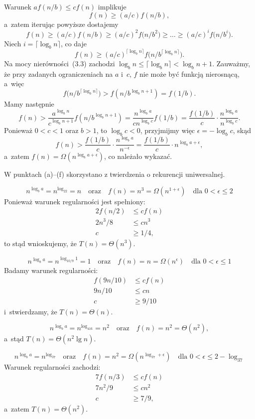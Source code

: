 \exercise %
Warunek $af(n/b)\le cf(n)$ implikuje
\[
	f(n) \ge (a/c)f(n/b),
\]
a~zatem iterując powyższe dostajemy
\[
	f(n) \ge (a/c)f(n/b) \ge (a/c)^2f\bigl(n/b^2\bigr) \ge \dots \ge (a/c)^if\bigl(n/b^i\bigr).
\]
Niech $i=\lceil\log_bn\rceil$, co daje
\[
	f(n) \ge (a/c)^{\lceil\log_bn\rceil}f\bigl(n/b^{\lceil\log_bn\rceil}\bigr).
\]
Na mocy nierówności~(3.3) zachodzi $\log_bn\le\lceil\log_b n\rceil<\log_bn+1$. Zauważmy, że przy zadanych ograniczeniach na $a$ i~$c$, $f$ nie może być funkcją nierosnącą, a~więc
\[
    f\bigl(n/b^{\lceil\log_bn\rceil}\bigr) > f(n/b^{\log_bn+1}) = f(1/b).
\]
Mamy następnie
\[
	f(n) > \frac{a^{\log_bn}}{c^{\log_bn+1}}f(n/b^{\log_bn+1}) = \frac{n^{\log_ba}}{cn^{\log_bc}}f(1/b) = \frac{f(1/b)}{c}\cdot\frac{n^{\log_ba}}{n^{\log_bc}}.
\]
Ponieważ $0<c<1$ oraz $b>1$, to $\log_bc<0$, przyjmijmy więc $\epsilon=-\log_bc$, skąd
\[
	f(n) > \frac{f(1/b)}{c}\cdot\frac{n^{\log_ba}}{n^{-\epsilon}} = \frac{f(1/b)}{c}\cdot n^{\log_ba+\epsilon},
\]
a~zatem $f(n)=\Omega(n^{\log_ba+\epsilon})$, co należało wykazać.

\problems

W punktach (a)\nobreakdash--(f) skorzystano z twierdzenia o rekurencji uniwersalnej.

\subproblem %
\[
	n^{\log_ba} = n^{\log_22} = n \quad\text{oraz}\quad f(n) = n^3 = \Omega(n^{1+\epsilon}) \quad\text{dla $0<\epsilon\le2$}
\]
Ponieważ warunek regularności jest spełniony:
\begin{align*}
	2f(n/2) &\le cf(n) \\
	2n^3\!/8 &\le cn^3 \\
	c &\ge 1/4,
\end{align*}
to stąd wnioskujemy, że $T(n)=\Theta(n^3)$.

\subproblem %
\[
	n^{\log_ba} = n^{\log_{10/9}1} = 1 \quad\text{oraz}\quad f(n) = n = \Omega(n^\epsilon) \quad\text{dla $0<\epsilon\le1$}
\]
Badamy warunek regularności:
\begin{align*}
	f(9n/10) &\le cf(n) \\
	9n/10 &\le cn \\
	c &\ge 9/10
\end{align*}
i~stwierdzamy, że $T(n)=\Theta(n)$.

\subproblem %
\[
	n^{\log_ba} = n^{\log_416} = n^2 \quad\text{oraz}\quad f(n) = n^2 = \Theta(n^2),
\]
a~stąd $T(n)=\Theta(n^2\lg n)$.

\subproblem %
\[
	n^{\log_ba} = n^{\log_37} \quad\text{oraz}\quad f(n) = n^2 = \Omega(n^{\log_37+\epsilon}) \quad\text{dla $0<\epsilon\le2-\log_37$}
\]
Warunek regularności zachodzi:
\begin{align*}
	7f(n/3) &\le cf(n) \\
	7n^2\!/9 &\le cn^2 \\
	c &\ge 7/9,
\end{align*}
a~zatem $T(n)=\Theta(n^2)$.

